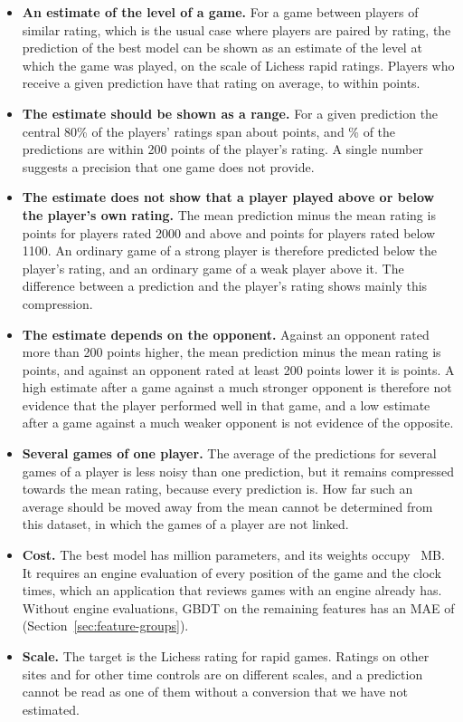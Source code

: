 \documentclass[11pt]{article}
\begin{document}
\begin{itemize}
\item \textbf{An estimate of the level of a game.} For a game between
players of similar rating, which is the usual case where players are paired
by rating, the prediction of the best model can be shown as an estimate of
the level at which the game was played, on the scale of Lichess rapid
ratings.\iflook{} Players who receive a given prediction have that rating on
average, to within  points.\fi
\iflook
\item \textbf{The estimate should be shown as a range.} For a given
prediction the central 80\% of the players' ratings span about
 points, and \% of the
predictions are within 200 points of the player's rating. A single number
suggests a precision that one game does not provide.
\item \textbf{The estimate does not show that a player played above or below
the player's own rating.} The mean prediction minus the mean rating is
 points for players rated 2000 and above
and  points for players rated below 1100.
An ordinary game of a strong player is therefore predicted below the player's
rating, and an ordinary game of a weak player above it. The difference
between a prediction and the player's rating shows mainly this compression.
\item \textbf{The estimate depends on the opponent.} Against an opponent
rated more than 200 points higher, the mean prediction minus the mean rating
is  points, and against an opponent rated
at least 200 points lower it is  points. A
high estimate after a game against a much stronger opponent is therefore not
evidence that the player performed well in that game, and a low estimate
after a game against a much weaker opponent is not evidence of the opposite.
\item \textbf{Several games of one player.} The average of the predictions
for several games of a player is less noisy than one prediction, but it
remains compressed towards the mean rating, because every prediction is. How
far such an average should be moved away from the mean cannot be determined
from this dataset, in which the games of a player are not linked.
\fi
\item \textbf{Cost.} The best model has  million
parameters, and its weights occupy ~MB. It requires
an engine evaluation of every position of the game and the clock times, which
an application that reviews games with an engine already has.
\iffeatures
Without engine evaluations, GBDT on the remaining features has an MAE of
 (Section~\ref{sec:feature-groups}).
\fi
\item \textbf{Scale.} The target is the Lichess rating for rapid games.
Ratings on other sites and for other time controls are on different scales,
and a prediction cannot be read as one of them without a conversion that we
have not estimated.
\end{itemize}
\end{document}
